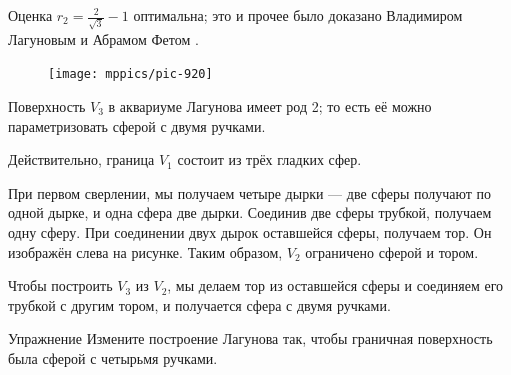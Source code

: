 Оценка $r_2=\tfrac2{\sqrt{3}}-1$ оптимальна;
это и прочее было доказано Владимиром Лагуновым и Абрамом Фетом \cite{lagunov-1960, lagunov-fet-1963, lagunov-fet-1965}.

\begin{figure}
\centering
\vskip-0mm
\texttt{[image: mppics/pic-920]}
\vskip0mm
\end{figure}

Поверхность $V_3$ в аквариуме Лагунова имеет род 2; то есть её можно параметризовать сферой с двумя ручками.

Действительно, граница $V_1$ состоит из трёх гладких сфер.

При первом сверлении, мы получаем четыре дырки --- две сферы получают по одной дырке, и одна сфера две дырки.
Соединив две сферы трубкой, получаем одну сферу.
При соединении двух дырок оставшейся сферы, получаем тор.
Он изображён слева на рисунке.
Таким образом, $V_2$ ограничено сферой и тором.

Чтобы построить $V_3$ из $V_2$, мы делаем тор из оставшейся сферы и соединяем его трубкой с другим тором, и получается сфера с двумя ручками.

\begin{thm}{Упражнение}\label{ex:lagunov-genus4}
Измените построение Лагунова так, чтобы граничная поверхность была сферой с четырьмя ручками.
\end{thm}




